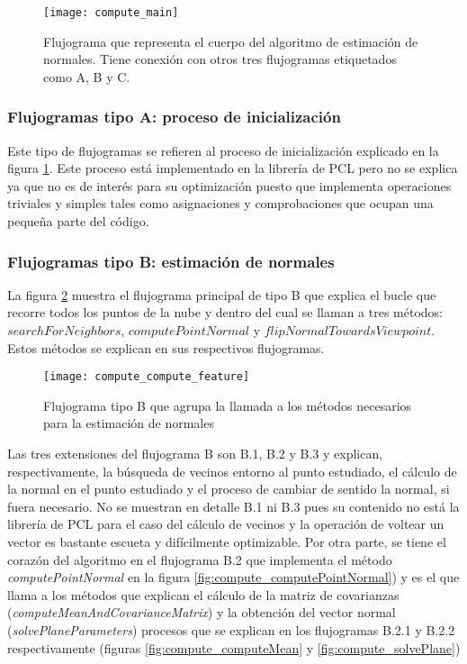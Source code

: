 \begin{figure}[h!]
\centering
\texttt{[image: compute\_main]}
\caption{Flujograma que representa el cuerpo del algoritmo de estimación de normales. Tiene conexión con otros tres flujogramas etiquetados como A, B y C.}\label{fig:compute_main}
\end{figure}

\subsubsection{Flujogramas tipo A: proceso de inicialización}
Este tipo de flujogramas se refieren al proceso de inicialización explicado en la figura \ref{fig:compute_main}. Este proceso está implementado en la librería de PCL pero no se explica ya que no es de interés para su optimización puesto que implementa operaciones triviales y simples tales como asignaciones y comprobaciones que ocupan una pequeña parte del código.




\subsubsection{Flujogramas tipo B: estimación de normales}

La figura \ref{fig:compute_compute_feature} muestra el flujograma principal de tipo B que explica el bucle que recorre todos los puntos de la nube y dentro del cual se llaman a tres métodos: $searchForNeighbors$, $computePointNormal$ y $flipNormalTowardsViewpoint$. Estos métodos se explican en sus respectivos flujogramas.

\begin{figure}[h!]
\centering
\texttt{[image: compute\_compute\_feature]}
\caption{Flujograma tipo B que agrupa la llamada a los métodos necesarios para la estimación de normales}\label{fig:compute_compute_feature}
\end{figure}

Las tres extensiones del flujograma B son B.1, B.2 y B.3 y explican, respectivamente, la búsqueda de vecinos entorno al punto estudiado, el cálculo de la normal en el punto estudiado y el proceso de cambiar de sentido la normal, si fuera necesario. No se muestran en detalle B.1 ni B.3 pues su contenido no está la librería de PCL para el caso del cálculo de vecinos y la operación de voltear un vector es bastante escueta y difícilmente optimizable. Por otra parte, se tiene el corazón del algoritmo en el flujograma B.2 que implementa el método \textit{computePointNormal} en la figura \ref{fig:compute_computePointNormal}) y es el que llama a los métodos que explican el cálculo de la matriz de covarianzas (\textit{computeMeanAndCovarianceMatrix}) y la obtención del vector normal (\textit{solvePlaneParameters}) procesos que se explican en los flujogramas B.2.1 y B.2.2 respectivamente (figuras \ref{fig:compute_computeMean} y \ref{fig:compute_solvePlane})



